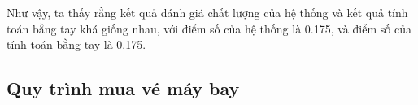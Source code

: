 Như vậy, ta thấy rằng kết quả đánh giá chất lượng của hệ thống và kết quả tính toán bằng tay khá giống nhau, với điểm số của hệ thống là 0.175, và điểm số của tính toán bằng tay là 0.175.
    
\subsection{Quy trình mua vé máy bay}